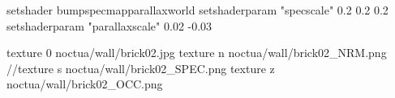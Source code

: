 setshader bumpspecmapparallaxworld
setshaderparam "specscale" 0.2 0.2 0.2
setshaderparam "parallaxscale" 0.02 -0.03

texture 0 noctua/wall/brick02.jpg
texture n noctua/wall/brick02_NRM.png
//texture s noctua/wall/brick02_SPEC.png
texture z noctua/wall/brick02_OCC.png

